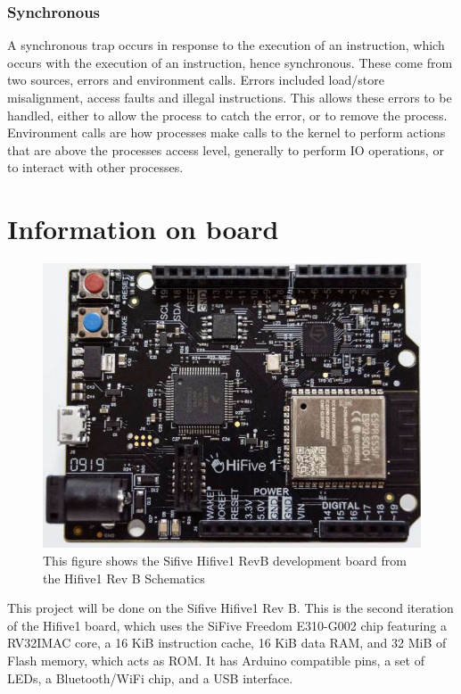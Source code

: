 \subsubsection{Synchronous}
A synchronous trap occurs in response to the execution of an instruction, which occurs with the execution of an instruction, hence synchronous. These come from two sources, errors and environment calls. Errors included load/store misalignment, access faults and illegal instructions. This allows these errors to be handled, either to allow the process to catch the error, or to remove the process. Environment calls are how processes make calls to the kernel to perform actions that are above the processes access level, generally to perform IO operations, or to interact with other processes.
\section{Information on board}
\begin{figure}[H]
    \includegraphics[width=0.6\columnwidth]{figures/board_image.png}
    \centering
    \caption[Sifive Hifive1 RevB]{This figure shows the Sifive Hifive1 RevB development board from the Hifive1 Rev B Schematics\cite{sifive_schematics}}
\end{figure}
This project will be done on the Sifive Hifive1 Rev B. This is the second iteration of the Hifive1 board, which uses the SiFive Freedom E310-G002 chip featuring a RV32IMAC core, a 16 KiB instruction cache, 16 KiB data RAM, and 32 MiB of Flash memory, which acts as ROM. It has Arduino compatible pins, a set of LEDs, a Bluetooth/WiFi chip, and a USB interface\cite{sifive_manual}.